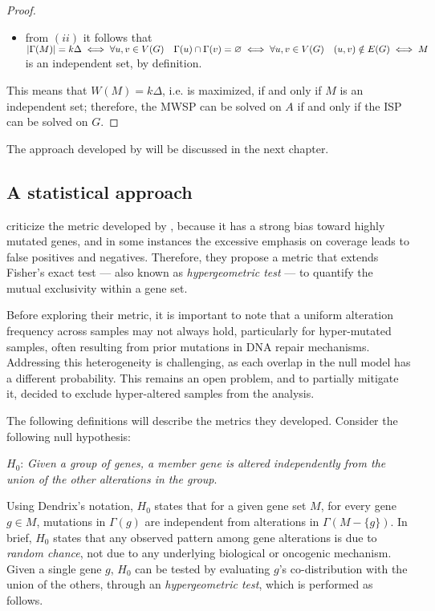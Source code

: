 \begin{proof}
\begin{itemize}
        \item from $(ii)$ it follows that $\left|\Gamma(M)\right| = k \Delta \iff \forall u, v \in V(G) \quad \Gamma(u) \cap \Gamma(v) = \varnothing \iff \forall u, v \in V(G) \quad (u, v) \notin E(G) \iff M$ is an independent set, by definition.
    \end{itemize}

    This means that $W(M) = k \Delta$, i.e. is maximized, if and only if $M$ is an independent set; therefore, the MWSP can be solved on $A$ if and only if the ISP can be solved on $G$.
\end{proof}

The approach developed by \textcite{dendrix} will be discussed in the next chapter.

\subsection{A statistical approach}

\textcite{mutex} criticize the metric developed by \textcite{dendrix}, because it has a strong bias toward highly mutated genes, and in some instances the excessive emphasis on coverage leads to false positives and negatives. Therefore, they propose a metric that extends Fisher's exact test --- also known as \textit{hypergeometric test} --- to quantify the mutual exclusivity within a gene set.

Before exploring their metric, it is important to note that a uniform alteration frequency across samples may not always hold, particularly for hyper-mutated samples, often resulting from prior mutations in DNA repair mechanisms. Addressing this heterogeneity is challenging, as each overlap in the null model has a different probability. This remains an open problem, and to partially mitigate it, \textcite{mutex} decided to exclude hyper-altered samples from the analysis.

The following definitions will describe the metrics they developed. Consider the following null hypothesis:

\begin{displayquote}
    $H_0$: \textit{Given a group of genes, a member gene is altered independently from the union of the other alterations in the group}.
\end{displayquote}

Using Dendrix's notation, $H_0$ states that for a given gene set $M$, for every gene $g \in M$, mutations in $\Gamma(g)$ are independent from alterations in $\Gamma(M - \{g\})$. In brief, $H_0$ states that any observed pattern among gene alterations is due to \textit{random chance}, not due to any underlying biological or oncogenic mechanism. Given a single gene $g$, $H_0$ can be tested by evaluating $g$'s co-distribution with the union of the others, through an \textit{hypergeometric test}, which is performed as follows.

